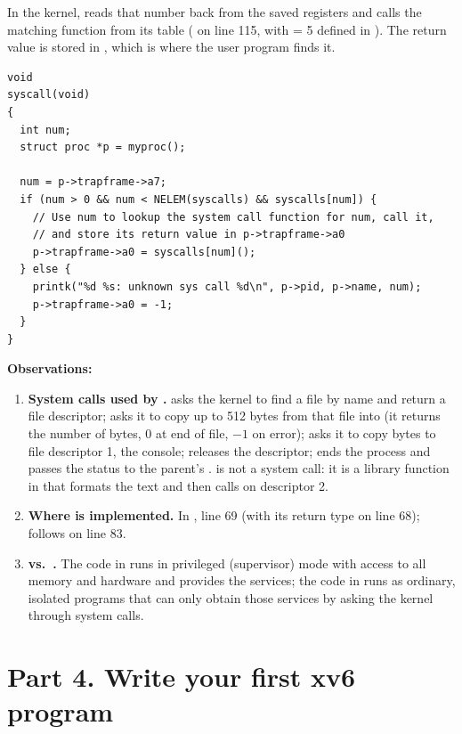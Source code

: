 \documentclass[11pt,a4paper]{article}
\begin{document}
In the kernel,  reads that number back from the saved registers and calls the
matching function from its table ( on line 115, with
 = 5 defined in ). The return value is stored in
, which is where the user program finds it.

\begin{lstlisting}[style=ccode,firstnumber=136]
void
syscall(void)
{
  int num;
  struct proc *p = myproc();

  num = p->trapframe->a7;
  if (num > 0 && num < NELEM(syscalls) && syscalls[num]) {
    // Use num to lookup the system call function for num, call it,
    // and store its return value in p->trapframe->a0
    p->trapframe->a0 = syscalls[num]();
  } else {
    printk("%d %s: unknown sys call %d\n", p->pid, p->name, num);
    p->trapframe->a0 = -1;
  }
}
\end{lstlisting}

\textbf{Observations:}
\begin{enumerate}
  \item \textbf{System calls used by .}  asks the
  kernel to find a file by name and return a file descriptor;  asks
  it to copy up to 512 bytes from that file into  (it returns the number of bytes,
  0 at end of file, $-1$ on error);  asks it to copy  bytes to
  file descriptor 1, the console;  releases the descriptor; 
  ends the process and passes the status to the parent's .  is not a
  system call: it is a library function in  that formats the text and then
  calls  on descriptor 2.
  \item \textbf{Where  is implemented.} In , line 69
  (with its return type  on line 68);  follows on line 83.
  \item \textbf{ vs.\ .} The code in  runs in
  privileged (supervisor) mode with access to all memory and hardware and provides the
  services; the code in  runs as ordinary, isolated programs that can only obtain
  those services by asking the kernel through system calls.
\end{enumerate}

\section{Part 4. Write your first xv6 program}
\end{document}
